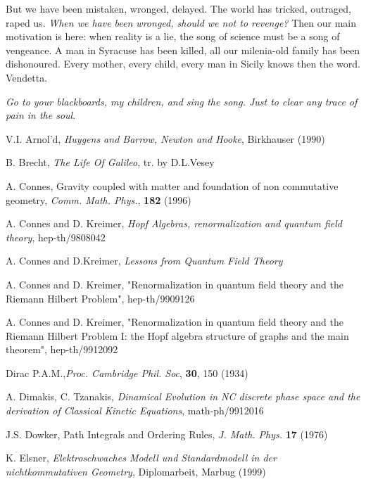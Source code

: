 \documentclass[a4paper,10pt]{article}
\begin{document}
But we have been mistaken, wronged, delayed. The world has 
tricked, outraged, raped us. {\it When we have been wronged, should we not
to revenge?} Then our main  
motivation is here: when reality is a lie, the song of science
must be a song of vengeance. A man in Syracuse has been killed, 
all our milenia-old 
family has been dishonoured. Every mother, every child, every man in Sicily  
knows then the word. Vendetta. 

{\it Go to your blackboards, my children, and sing the song.
Just to clear any trace
of pain in the soul}.


\small

\begin{thebibliography}{25}

 V.I. Arnol'd, {\it Huygens and Barrow, Newton
and Hooke}, Birkhauser (1990)

 B. Brecht, {\it The Life Of Galileo}, tr. by D.L.Vesey

 A. Connes, Gravity coupled with matter and foundation
of non commutative geometry, {\it Comm. Math. Phys.}, {\bf 182} (1996)

 A. Connes and D. Kreimer, { \it Hopf Algebras, renormalization
and quantum field theory}, hep-th/9808042

 A. Connes and D.Kreimer, {\it Lessons from 
Quantum Field Theory}

 A. Connes and D. Kreimer, "Renormalization in quantum
field theory and the Riemann Hilbert Problem", hep-th/9909126

 A. Connes and D. Kreimer, "Renormalization in quantum
field theory and the Riemann Hilbert Problem I: the Hopf algebra
structure of graphs and the main theorem", hep-th/9912092

 Dirac P.A.M.,{\it Proc. Cambridge Phil. Soc},
 {\bf 30}, 150 (1934)

 A. Dimakis, C. Tzanakis, {\it Dinamical Evolution in NC
discrete phase space and the derivation of Classical Kinetic Equations},
math-ph/9912016

 J.S. Dowker,  Path Integrals and Ordering
Rules, {\it J. Math. Phys.} {\bf 17} (1976)

 K. Elsner, {\it Elektroschwaches Modell und Standardmodell
in der nichtkommutativen Geometry}, Diplomarbeit, Marbug (1999)


\end{thebibliography}
\end{document}
